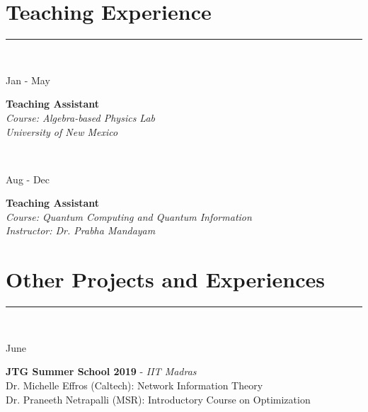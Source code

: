 \documentclass[10pt]{article}
\newcommand\vtick{\textquotesingle}
\begin{document}
\vspace{0.3cm}
\section*{\color{black} Teaching Experience}
\noindent\textcolor{black}{\rule{\textwidth}{1pt}} \vspace{-0.2cm}\\
\begin{minipage}[t]{.2\textwidth}
Jan\vtick21 - May\vtick21
\end{minipage}
\begin{minipage}[t]{0.8\textwidth}
{\bf Teaching Assistant} \\
{\it Course: Algebra-based Physics Lab}\\
{\it University of New Mexico}
\end{minipage} \\

\noindent
\begin{minipage}[t]{.2\textwidth}
Aug\vtick18 - Dec\vtick18
\end{minipage}
\begin{minipage}[t]{0.8\textwidth}
{\bf Teaching Assistant} \\
{\it Course: Quantum Computing and Quantum Information}\\
{\it Instructor: Dr. Prabha Mandayam}
\end{minipage}

\vspace{0.3cm}
\section*{\color{black} Other Projects and Experiences}
\noindent\textcolor{black}{\rule{\textwidth}{1pt}} \vspace{-0.2cm}\\
\begin{minipage}[t]{.2\textwidth}
June\vtick19 
\end{minipage}
\begin{minipage}[t]{0.8\textwidth}
{\bf JTG Summer School 2019} - {\it IIT Madras} \\
Dr. Michelle Effros (Caltech): Network Information Theory \\
Dr. Praneeth Netrapalli (MSR): Introductory Course on Optimization
\end{minipage} \\
\end{document}
